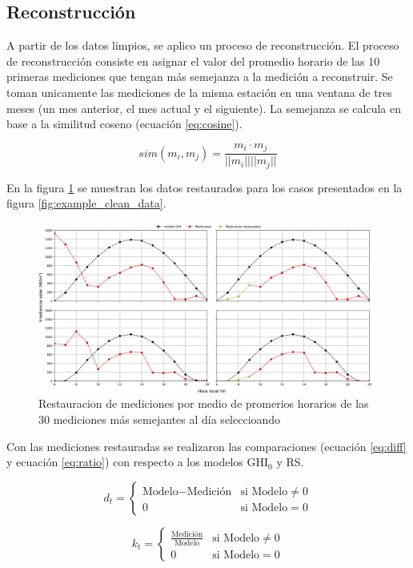 \subsection{Reconstrucción}

A partir de los datos limpios, se aplico un proceso de reconstrucción. El proceso de reconstrucción consiste en asignar el valor del promedio horario de las 10 primeras mediciones que tengan más semejanza a la medición a reconstruir. Se toman unicamente las mediciones de la misma estación en una ventana de tres meses (un mes anterior, el mes actual y el siguiente). La semejanza se calcula en base a la similitud coseno (ecuación \ref{eq:cosine}).

\begin{equation}
	sim(m_i , m_j ) = \frac{m_i \cdot m_j}{||m_i|| ||m_j||}
	\label{eq:cosine}
\end{equation}

En la figura \ref{fig:restoration} se muestran los datos restaurados para los casos presentados en la figura \ref{fig:example_clean_data}.

\begin{figure}[H]
	\centering
	\includegraphics[width=15cm]{Graphics/example_restoration.png}
	\caption{Restauracion de mediciones por medio de promerios horarios de las 30 mediciones más semejantes al día seleccioando}
	\label{fig:restoration}
\end{figure}

Con las mediciones restauradas se realizaron las comparaciones (ecuación \ref{eq:diff} y ecuación \ref{eq:ratio}) con respecto a los modelos GHI$_0$ y RS.

\begin{equation}
	d_t = \begin{cases}
		\text{Modelo} - \text{Medición} & \text{si Modelo}\neq 0\\
		0 & \text{si Modelo} = 0
	\end{cases}
	\label{eq:diff}
\end{equation}

\begin{equation}
	k_t = \begin{cases}
		\frac{\text{Medición}}{\text{Modelo}} & \text{si Modelo}\neq 0\\
		0 & \text{si Modelo} = 0
	\end{cases}
	\label{eq:ratio}
\end{equation}
